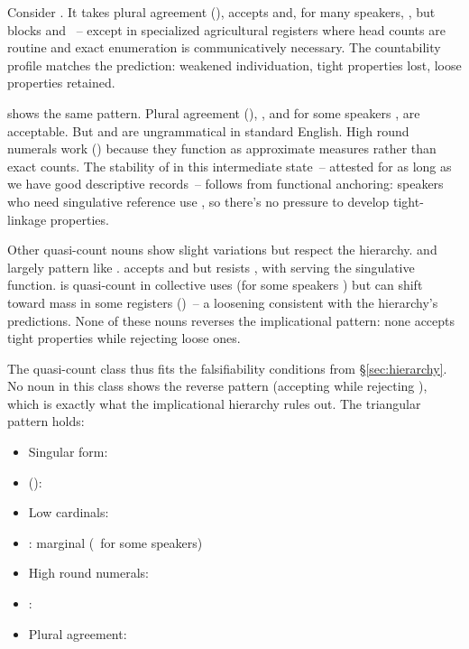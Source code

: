 \documentclass[12pt,a4paper]{article}
\newcommand{\cmark}{\ding{51}} %
\newcommand{\xmark}{\ding{55}} %
\begin{document}
Consider . It takes plural agreement (), accepts  and, for many speakers, , but blocks  and ~-- except in specialized agricultural registers where head counts are routine and exact enumeration is communicatively necessary. The countability profile matches the prediction: weakened individuation, tight properties lost, loose properties retained.

 shows the same pattern. Plural agreement (), , and for some speakers , are acceptable. But  and  are ungrammatical in standard English. High round numerals work () because they function as approximate measures rather than exact counts. The stability of  in this intermediate state~-- attested for as long as we have good descriptive records~-- follows from functional anchoring: speakers who need singulative reference use , so there's no pressure to develop tight-linkage properties.

Other quasi-count nouns show slight variations but respect the hierarchy.  and  largely pattern like .  accepts  and  but resists , with  serving the singulative function.  is quasi-count in collective uses (for some speakers ) but can shift toward mass in some registers ()~-- a loosening consistent with the hierarchy's predictions. None of these nouns reverses the implicational pattern: none accepts tight properties while rejecting loose ones.

The quasi-count class thus fits the falsifiability conditions from \S\ref{sec:hierarchy}. No noun in this class shows the reverse pattern (accepting  while rejecting ), which is exactly what the implicational hierarchy rules out. The triangular pattern holds:

\begin{itemize}
\item Singular form: \xmark
\item {}(): \xmark
\item Low cardinals: \xmark
\item {}: marginal (\cmark\ for some speakers)
\item High round numerals: \cmark
\item {}: \cmark
\item Plural agreement: \cmark
\end{itemize}
\end{document}
